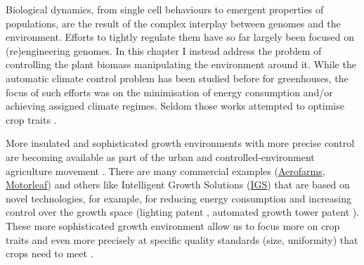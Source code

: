 Biological dynamics, from single cell behaviours to emergent properties of
populations, are the result of the complex interplay between genomes and the
environment. Efforts to tightly regulate them have so far largely been focused
on (re)engineering genomes. In this chapter I instead address the problem of
controlling the plant biomass manipulating the environment around it. While the
automatic climate control problem has been studied before for greenhouses, the
focus of such efforts was on the minimisation of energy consumption and/or
achieving assigned climate regimes. Seldom those works attempted to optimise
crop traits \citep{chalabi1996, udinktencate1983, challa_1990, aaslyng2003}.

More insulated and sophisticated growth environments with more precise control
are becoming available as part of the urban and controlled-environment
agriculture movement \citep{mok_strawberry_2014, despommier_farming_2013}. There
are many commercial examples (\href{https://aerofarms.com/}{Aerofarms},
\href{https://motorleaf.com/}{Motorleaf}) and others like Intelligent Growth
Solutions (\href{https://www.intelligentgrowthsolutions.com/}{IGS}) that are
based on novel technologies, for example, for reducing energy consumption and
increasing control over the growth space (lighting patent
\cite{aykroyd_novel_2016}, automated growth tower patent
\cite{aykroyd_automated_2018}). These more sophisticated growth environment
allow us to focus more on crop traits and even more precisely at specific
quality standards (size, uniformity) that crops need to meet \citep[see for
example EU marketing standards on fruit and vegetables;][]{eu-543-2011}.

